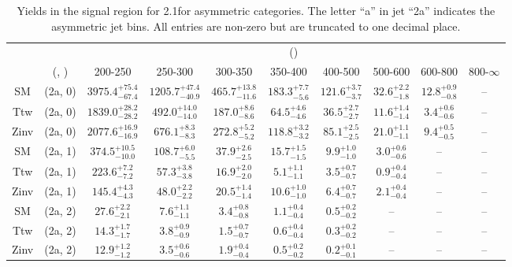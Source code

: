 \begin{table}[h!]
\tiny
\centering
\caption{Yields in the signal region for 2.1\ifb for asymmetric categories. The letter ``a'' in jet \eg ``2a''  indicates the asymmetric jet bins. All entries are non-zero but are truncated to one decimal place.\label{tab:yieldsnodata_sig_comb_asym}}
\begin{tabular}
{cccccccccc}
	\hline\hline
	&	& \multicolumn{8}{c}{\scalht (\gev)}\\ 
	&	 (\njet, \nb) & 200-250 & 250-300 & 300-350 & 350-400 & 400-500 & 500-600 & 600-800 & 800-$\infty$ \\ [0.8ex] 
\hline
	SM & (2a, 0) & $3975.4^{+ 75.4 }_{- 67.4 }$ & $1205.7^{+ 47.4 }_{- 40.9 }$ & $465.7^{+ 13.8 }_{- 11.6 }$ & $183.3^{+ 7.7 }_{- 5.6 }$ & $121.6^{+ 3.7 }_{- 3.7 }$ & $32.6^{+ 2.2 }_{- 1.8 }$ & $12.8^{+ 0.9 }_{- 0.8 }$ & -- \\[0.5ex] 
	Ttw & (2a, 0) & $1839.0^{+ 28.2 }_{- 28.2 }$ & $492.0^{+ 14.0 }_{- 14.0 }$ & $187.0^{+ 8.6 }_{- 8.6 }$ & $64.5^{+ 4.6 }_{- 4.6 }$ & $36.5^{+ 2.7 }_{- 2.7 }$ & $11.6^{+ 1.4 }_{- 1.4 }$ & $3.4^{+ 0.6 }_{- 0.6 }$ & -- \\[0.5ex] 
	Zinv & (2a, 0) & $2077.6^{+ 16.9 }_{- 16.9 }$ & $676.1^{+ 8.3 }_{- 8.3 }$ & $272.8^{+ 5.2 }_{- 5.2 }$ & $118.8^{+ 3.2 }_{- 3.2 }$ & $85.1^{+ 2.5 }_{- 2.5 }$ & $21.0^{+ 1.1 }_{- 1.1 }$ & $9.4^{+ 0.5 }_{- 0.5 }$ & -- \\[0.5ex] 
	SM & (2a, 1) & $374.5^{+ 10.5 }_{- 10.0 }$ & $108.7^{+ 6.0 }_{- 5.5 }$ & $37.9^{+ 2.6 }_{- 2.5 }$ & $15.7^{+ 1.5 }_{- 1.5 }$ & $9.9^{+ 1.0 }_{- 1.0 }$ & $3.0^{+ 0.6 }_{- 0.6 }$ & -- & -- \\[0.5ex] 
	Ttw & (2a, 1) & $223.6^{+ 7.2 }_{- 7.2 }$ & $57.3^{+ 3.8 }_{- 3.8 }$ & $16.9^{+ 2.0 }_{- 2.0 }$ & $5.1^{+ 1.1 }_{- 1.1 }$ & $3.5^{+ 0.7 }_{- 0.7 }$ & $0.9^{+ 0.4 }_{- 0.4 }$ & -- & -- \\[0.5ex] 
	Zinv & (2a, 1) & $145.4^{+ 4.3 }_{- 4.3 }$ & $48.0^{+ 2.2 }_{- 2.2 }$ & $20.5^{+ 1.4 }_{- 1.4 }$ & $10.6^{+ 1.0 }_{- 1.0 }$ & $6.4^{+ 0.7 }_{- 0.7 }$ & $2.1^{+ 0.4 }_{- 0.4 }$ & -- & -- \\[0.5ex] 
	SM & (2a, 2) & $27.6^{+ 2.2 }_{- 2.1 }$ & $7.6^{+ 1.1 }_{- 1.1 }$ & $3.4^{+ 0.8 }_{- 0.8 }$ & $1.1^{+ 0.4 }_{- 0.4 }$ & $0.5^{+ 0.2 }_{- 0.2 }$ & -- & -- & -- \\[0.5ex] 
	Ttw & (2a, 2) & $14.3^{+ 1.7 }_{- 1.7 }$ & $3.8^{+ 0.9 }_{- 0.9 }$ & $1.5^{+ 0.7 }_{- 0.7 }$ & $0.6^{+ 0.4 }_{- 0.4 }$ & $0.3^{+ 0.2 }_{- 0.2 }$ & -- & -- & -- \\[0.5ex] 
	Zinv & (2a, 2) & $12.9^{+ 1.2 }_{- 1.2 }$ & $3.5^{+ 0.6 }_{- 0.6 }$ & $1.9^{+ 0.4 }_{- 0.4 }$ & $0.5^{+ 0.2 }_{- 0.2 }$ & $0.2^{+ 0.1 }_{- 0.1 }$ & -- & -- & -- \\[0.5ex] 

\end{tabular}
\end{table}
